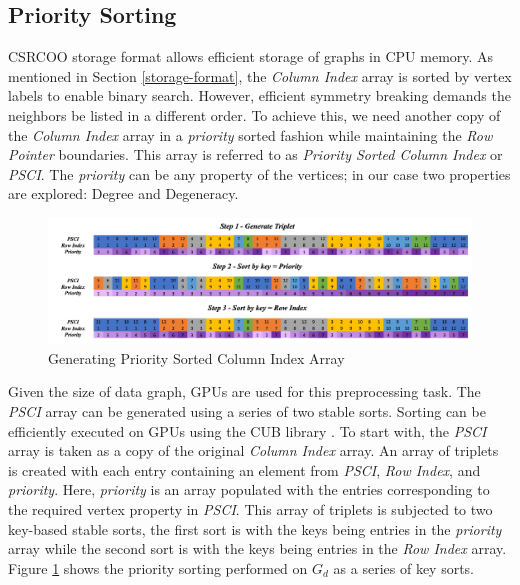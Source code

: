 \subsection{Priority Sorting}\label{sec:prio-sorting}
CSRCOO storage format allows efficient storage of graphs in CPU memory.
As mentioned in Section \ref{storage-format}, the \textit{Column Index} array is sorted by vertex labels to enable binary search.
However, efficient symmetry breaking demands the neighbors be listed in a different order.
To achieve this, we need another copy of the \textit{Column Index} array in a \textit{priority} sorted fashion while maintaining the \textit{Row Pointer} boundaries. This array is referred to as \textit{Priority Sorted Column Index} or \textit{PSCI}.
The \textit{priority} can be any property of the vertices; in our case two properties are explored: Degree and Degeneracy.
\begin{figure}
    \includegraphics[width=\textwidth]{fig/LR/prio-sorting.png}
    \caption{Generating Priority Sorted Column Index Array}
    \label{fig:prio-sorting}
\end{figure}
Given the size of data graph, GPUs are used for this preprocessing task.
The \textit{PSCI} array can be generated using a series of two stable sorts. 
Sorting can be efficiently executed on GPUs using the CUB library \cite{cub}.
To start with, the \textit{PSCI} array is taken as a copy of the original \textit{Column Index} array.
An array of triplets is created with each entry containing an element from \textit{PSCI}, \textit{Row Index}, and \textit{priority}. 
Here, \textit{priority} is an array populated with the entries corresponding to the required vertex property in \textit{PSCI}.
This array of triplets is subjected to two key-based stable sorts, the first sort is with the keys being entries in the \textit{priority} array while the second sort is with the keys being entries in the \textit{Row Index} array. Figure \ref{fig:prio-sorting} shows the priority sorting performed on $G_d$ as a series of key sorts.


